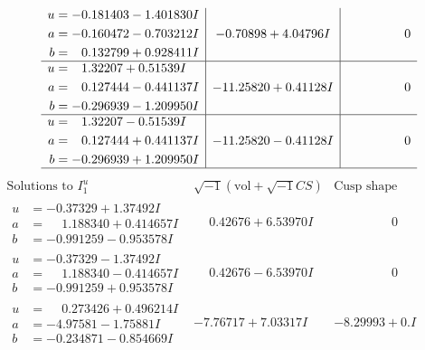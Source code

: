 \documentclass[1p]{elsarticle_modified}
\theoremstyle{definition}
\newcommand{\I}{\sqrt{-1}}
\begin{document}
$$\begin{array}{c|c|c}
\begin{aligned}
u &= -0.181403 - 1.401830 I \\
a &= -0.160472 - 0.703212 I \\
b &= \phantom{-}0.132799 + 0.928411 I\end{aligned}
 & -0.70898 + 4.04796 I & \phantom{-0.000000 } 0 \\ \hline\begin{aligned}
u &= \phantom{-}1.32207 + 0.51539 I \\
a &= \phantom{-}0.127444 - 0.441137 I \\
b &= -0.296939 - 1.209950 I\end{aligned}
 & -11.25820 + 0.41128 I & \phantom{-0.000000 } 0 \\ \hline\begin{aligned}
u &= \phantom{-}1.32207 - 0.51539 I \\
a &= \phantom{-}0.127444 + 0.441137 I \\
b &= -0.296939 + 1.209950 I\end{aligned}
 & -11.25820 - 0.41128 I & \phantom{-0.000000 } 0\\
 \hline 
 \end{array}$$\newpage$$\begin{array}{c|c|c}  
\text{Solutions to }I^u_{1}& \I (\text{vol} + \sqrt{-1}CS) & \text{Cusp shape}\\
 \hline 
\begin{aligned}
u &= -0.37329 + 1.37492 I \\
a &= \phantom{-}1.188340 + 0.414657 I \\
b &= -0.991259 - 0.953578 I\end{aligned}
 & \phantom{-}0.42676 + 6.53970 I & \phantom{-0.000000 } 0 \\ \hline\begin{aligned}
u &= -0.37329 - 1.37492 I \\
a &= \phantom{-}1.188340 - 0.414657 I \\
b &= -0.991259 + 0.953578 I\end{aligned}
 & \phantom{-}0.42676 - 6.53970 I & \phantom{-0.000000 } 0 \\ \hline\begin{aligned}
u &= \phantom{-}0.273426 + 0.496214 I \\
a &= -4.97581 - 1.75881 I \\
b &= -0.234871 - 0.854669 I\end{aligned}
 & -7.76717 + 7.03317 I & -8.29993 + 0. I\phantom{ +0.000000I} \\ \hline\begin{aligned}

\end{aligned}
\end{array}$$
\end{document}

